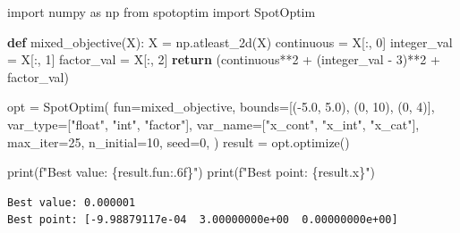 \documentclass[
  twocolumn]{article}
\newenvironment{Shaded}{\begin{snugshade}}{\end{snugshade}}
\newcommand{\BuiltInTok}[1]{\textcolor[rgb]{0.00,0.23,0.31}{#1}}
\newcommand{\ControlFlowTok}[1]{\textcolor[rgb]{0.00,0.23,0.31}{\textbf{#1}}}
\newcommand{\DecValTok}[1]{\textcolor[rgb]{0.68,0.00,0.00}{#1}}
\newcommand{\FloatTok}[1]{\textcolor[rgb]{0.68,0.00,0.00}{#1}}
\newcommand{\ImportTok}[1]{\textcolor[rgb]{0.00,0.46,0.62}{#1}}
\newcommand{\KeywordTok}[1]{\textcolor[rgb]{0.00,0.23,0.31}{\textbf{#1}}}
\newcommand{\NormalTok}[1]{\textcolor[rgb]{0.00,0.23,0.31}{#1}}
\newcommand{\OperatorTok}[1]{\textcolor[rgb]{0.37,0.37,0.37}{#1}}
\newcommand{\SpecialCharTok}[1]{\textcolor[rgb]{0.37,0.37,0.37}{#1}}
\newcommand{\SpecialStringTok}[1]{\textcolor[rgb]{0.13,0.47,0.30}{#1}}
\newcommand{\StringTok}[1]{\textcolor[rgb]{0.13,0.47,0.30}{#1}}
\begin{document}
\begin{Shaded}
\begin{Highlighting}[]
\ImportTok{import}\NormalTok{ numpy }\ImportTok{as}\NormalTok{ np}
\ImportTok{from}\NormalTok{ spotoptim }\ImportTok{import}\NormalTok{ SpotOptim}

\KeywordTok{def}\NormalTok{ mixed\_objective(X):}
\NormalTok{    X }\OperatorTok{=}\NormalTok{ np.atleast\_2d(X)}
\NormalTok{    continuous }\OperatorTok{=}\NormalTok{ X[:, }\DecValTok{0}\NormalTok{]}
\NormalTok{    integer\_val }\OperatorTok{=}\NormalTok{ X[:, }\DecValTok{1}\NormalTok{]}
\NormalTok{    factor\_val }\OperatorTok{=}\NormalTok{ X[:, }\DecValTok{2}\NormalTok{]}
    \ControlFlowTok{return}\NormalTok{ (continuous}\OperatorTok{**}\DecValTok{2}
            \OperatorTok{+}\NormalTok{ (integer\_val }\OperatorTok{{-}} \DecValTok{3}\NormalTok{)}\OperatorTok{**}\DecValTok{2}
            \OperatorTok{+}\NormalTok{ factor\_val)}

\NormalTok{opt }\OperatorTok{=}\NormalTok{ SpotOptim(}
\NormalTok{    fun}\OperatorTok{=}\NormalTok{mixed\_objective,}
\NormalTok{    bounds}\OperatorTok{=}\NormalTok{[(}\OperatorTok{{-}}\FloatTok{5.0}\NormalTok{, }\FloatTok{5.0}\NormalTok{), (}\DecValTok{0}\NormalTok{, }\DecValTok{10}\NormalTok{), (}\DecValTok{0}\NormalTok{, }\DecValTok{4}\NormalTok{)],}
\NormalTok{    var\_type}\OperatorTok{=}\NormalTok{[}\StringTok{"float"}\NormalTok{, }\StringTok{"int"}\NormalTok{, }\StringTok{"factor"}\NormalTok{],}
\NormalTok{    var\_name}\OperatorTok{=}\NormalTok{[}\StringTok{"x\_cont"}\NormalTok{, }\StringTok{"x\_int"}\NormalTok{, }\StringTok{"x\_cat"}\NormalTok{],}
\NormalTok{    max\_iter}\OperatorTok{=}\DecValTok{25}\NormalTok{,}
\NormalTok{    n\_initial}\OperatorTok{=}\DecValTok{10}\NormalTok{,}
\NormalTok{    seed}\OperatorTok{=}\DecValTok{0}\NormalTok{,}
\NormalTok{)}
\NormalTok{result }\OperatorTok{=}\NormalTok{ opt.optimize()}

\BuiltInTok{print}\NormalTok{(}\SpecialStringTok{f"Best value: }\SpecialCharTok{\{}\NormalTok{result}\SpecialCharTok{.}\NormalTok{fun}\SpecialCharTok{:.6f\}}\SpecialStringTok{"}\NormalTok{)}
\BuiltInTok{print}\NormalTok{(}\SpecialStringTok{f"Best point: }\SpecialCharTok{\{}\NormalTok{result}\SpecialCharTok{.}\NormalTok{x}\SpecialCharTok{\}}\SpecialStringTok{"}\NormalTok{)}
\end{Highlighting}
\end{Shaded}

\begin{verbatim}
Best value: 0.000001
Best point: [-9.98879117e-04  3.00000000e+00  0.00000000e+00]
\end{verbatim}
\end{document}
